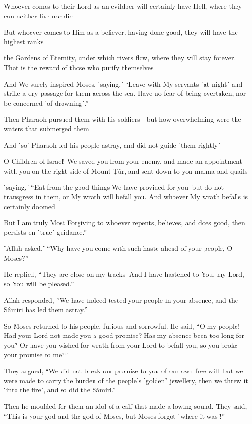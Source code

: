 Whoever comes to their Lord as an evildoer will certainly have Hell, where they can neither live nor die

But whoever comes to Him as a believer, having done good, they will have the highest ranks

the Gardens of Eternity, under which rivers flow, where they will stay forever. That is the reward of those who purify themselves

And We surely inspired Moses, ˹saying,˺ “Leave with My servants ˹at night˺ and strike a dry passage for them across the sea. Have no fear of being overtaken, nor be concerned ˹of drowning˺.”

Then Pharaoh pursued them with his soldiers—but how overwhelming were the waters that submerged them

And ˹so˺ Pharaoh led his people astray, and did not guide ˹them rightly˺

O Children of Israel! We saved you from your enemy, and made an appointment with you on the right side of Mount Ṭûr, and sent down to you manna and quails

˹saying,˺ “Eat from the good things We have provided for you, but do not transgress in them, or My wrath will befall you. And whoever My wrath befalls is certainly doomed

But I am truly Most Forgiving to whoever repents, believes, and does good, then persists on ˹true˺ guidance.”

˹Allah asked,˺ “Why have you come with such haste ahead of your people, O Moses?”

He replied, “They are close on my tracks. And I have hastened to You, my Lord, so You will be pleased.”

Allah responded, “We have indeed tested your people in your absence, and the Sâmiri has led them astray.”

So Moses returned to his people, furious and sorrowful. He said, “O my people! Had your Lord not made you a good promise? Has my absence been too long for you? Or have you wished for wrath from your Lord to befall you, so you broke your promise to me?”

They argued, “We did not break our promise to you of our own free will, but we were made to carry the burden of the people’s ˹golden˺ jewellery, then we threw it ˹into the fire˺, and so did the Sâmiri.”

Then he moulded for them an idol of a calf that made a lowing sound. They said, “This is your god and the god of Moses, but Moses forgot ˹where it was˺!”


